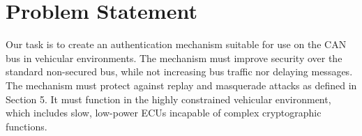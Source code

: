 \section{Problem Statement}
\label{problem}

Our task is to create an authentication mechanism suitable for use on the CAN bus in vehicular environments. 
The mechanism must improve security over the standard non-secured bus, while 
not increasing bus traffic nor delaying messages.
The mechanism must protect against replay and masquerade attacks as defined in Section 5.
It must function in the highly constrained vehicular environment,
which includes slow, low-power ECUs incapable of complex cryptographic functions.
